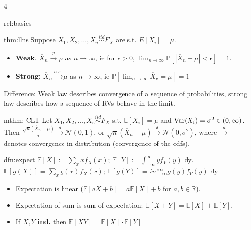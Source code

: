 \documentclass[landscape, 8pt]{extarticle}
\begin{document}
\begin{multicols*}{4}
\begin{rcl}[Basics]{rcl:basics}{ }
		\end{rcl}
		
		
		\begin{thm}{thm:llns}{ }
			Suppose $X_1, X_2, \dots, X_n \overset{iid}{\sim} F_X$ are s.t. $E[X_i] = \mu$.
			\begin{itemize}
				\item \textbf{Weak}: $\overline{X}_n \overset{p}{\to} \mu$ as $n \to \infty$, ie for $\epsilon > 0$, $\lim_{n\to \infty} \mathbb{P}[|\overline{X}_n - \mu| <\epsilon] = 1$.
				\item \textbf{Strong:} $\overline{X}_n \overset{a.s.}{\to} \mu$ as $n \to \infty$, ie $\mathbb{P}[\lim_{n\to \infty} \overline{X}_n = \mu] = 1$ 
			\end{itemize}
			Difference: Weak law describes convergence of a sequence of probabilities, strong law describes how a sequence of RVs behave in the limit.
			
		\end{thm}
		
		
		\begin{mthm}{mthm: CLT}{ }
			Let $X_1, X_2, \dots, X_n \overset{iid}{\sim} F_X$ s.t. $\mathbb{E}[X_i] = \mu$ and $\operatorname{Var}(X_i) = \sigma^2\in (0, \infty)$.\\
			Then $\frac{\sqrt{n} (\overline{X}_n - \mu)}{\sigma} \overset{d}{\to} \mathcal{N}(0, 1)$, or $\sqrt{n} (\overline{X}_n - \mu) \overset{d}{\to} \mathcal{N}(0, \sigma^2)$, where $\overset{d}{\to}$ denotes convergence in distribution (convergence of the cdfs).
			
		\end{mthm}
		
		
		\begin{dfn}[Expectation]{dfn:expect}{ }
			$\mathbb{E}[X] := \sum_x x f_X(x)$; $\mathbb{E}[Y] := \int_{-\infty}^{\infty} y f_Y(y) \text{ dy}$.\\
			$\mathbb{E}[g(X)] = \sum_x g(x) f_X(x)$; $\mathbb{E}[g(Y)] = int_{-\infty}^{\infty}g(y) f_Y(y) \text{ dy}$
			\begin{itemize}
				\item Expectation is linear ($\mathbb{E}[aX + b] = a\mathbb{E}[X] + b$ for $a, b\in \mathbb{R}$).
				\item Expectation of sum is sum of expectation: $\mathbb{E}[X + Y] = \mathbb{E}[X] + \mathbb{E}[Y]$.
				\item If $X, Y$ \textbf{ind.} then $\mathbb{E}[XY] = \mathbb{E}[X] \cdot  \mathbb{E}[Y]$
			\end{itemize}
			

\end{dfn}
\end{multicols*}
\end{document}
